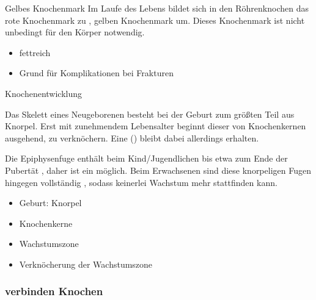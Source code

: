 
\TextSlide
{Gelbes Knochenmark}
{%
Im Laufe des Lebens bildet sich in den
Röhrenknochen das rote Knochenmark  zu ,
gelben Knochenmark um.
Dieses Knochenmark ist nicht unbedingt für den Körper
notwendig. 
%
}
{%
\begin{itemize}
  \item fettreich
  \item Grund für Komplikationen bei Frakturen
\end{itemize}
}
{}{}{}
\begin{Synopsis}
\end{Synopsis}


\TextSlide
{Knochenentwicklung}
{%
Das Skelett eines Neugeborenen besteht bei der Geburt zum
größten Teil aus Knorpel. Erst mit zunehmendem Lebensalter
beginnt dieser von Knochenkernen ausgehend, zu verknöchern.
Eine
() bleibt dabei allerdings erhalten.

Die Epiphysenfuge enthält beim Kind/Jugendlichen bis etwa
zum Ende der Pubertät ,
daher ist ein  möglich. Beim Erwachsenen
sind diese knorpeligen Fugen hingegen vollständig
, sodass keinerlei Wachstum mehr stattfinden
kann.
}
{%
\begin{itemize}
  \item Geburt: Knorpel
  \item Knochenkerne
  \item Wachstumszone
  \item Verknöcherung der Wachstumszone
\end{itemize}
}
{}{}{}

\subsubsection{ verbinden Knochen}



